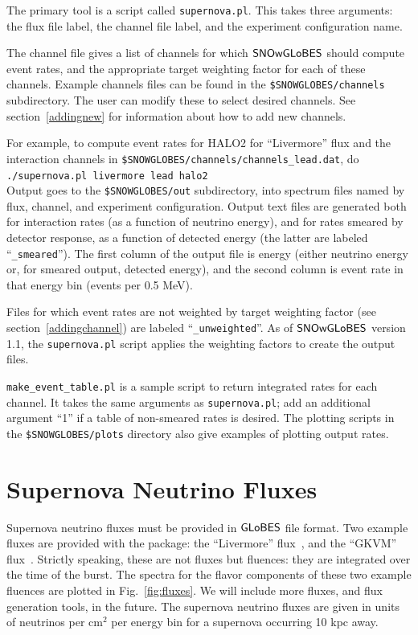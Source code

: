 \documentclass[12pt]{article}
\newcommand{\globes}{\sf{GLoBES}}
\newcommand{\snowglobes}{\sf{SNOwGLoBES}}
\begin{document}
The primary tool is a script called \texttt{supernova.pl}.  This takes three arguments: the flux file label, the channel file label, and the experiment configuration name.

The channel file gives a list of channels for which $\snowglobes$
should compute event rates, and the appropriate target weighting
factor for each of these channels.  Example channels files can be
found in the \texttt{\$SNOWGLOBES/channels} subdirectory.  The user can
modify these to select desired channels.  See section~\ref{addingnew}
for information about how to add new channels.

For example, to compute event rates for HALO2 for ``Livermore'' flux and  the interaction channels in
\texttt{\$SNOWGLOBES/channels/channels\_lead.dat}, do\\

\texttt{./supernova.pl livermore lead halo2} \\

Output goes to the \texttt{\$SNOWGLOBES/out} subdirectory, into spectrum files
named by flux, channel, and experiment configuration.  Output text
files are generated both for interaction rates (as a function of
neutrino energy), and for rates smeared by detector response, as a
function of detected energy (the latter are labeled ``\texttt{\_smeared}'').  The
first column of the output file is energy (either neutrino energy or,
for smeared output, detected energy), and the second column is event
rate in that energy bin (events per 0.5 MeV).

Files for which event rates are not weighted by target weighting factor (see section~\ref{addingchannel}) are labeled ``\texttt{\_unweighted}''.  As of
$\snowglobes$ version 1.1, the \texttt{supernova.pl} script applies the weighting factors to create the output files.

\texttt{make\_event\_table.pl} is a sample script to return integrated
rates for each channel.   It takes the same arguments as \texttt{supernova.pl}; add an additional argument ``1'' if a table of non-smeared rates is desired.
The
plotting scripts in the \texttt{\$SNOWGLOBES/plots} directory also
give examples of plotting output rates.

\section{Supernova Neutrino Fluxes}

Supernova neutrino fluxes must be provided in $\globes$ file format.  Two
example fluxes are provided with the package: the ``Livermore''
flux~\cite{Totani:1997vj}, and the ``GKVM'' flux~\cite{Gava:2009pj}.
Strictly speaking, these are not fluxes but fluences: they are
integrated over the time of the burst.  The spectra for the flavor
components of these two example fluences are plotted in
Fig.~\ref{fig:fluxes}.  We will include more fluxes, and flux generation tools, in the future.
The supernova neutrino fluxes are given in units of neutrinos per cm$^{2}$ per
energy bin for a supernova occurring 10 kpc away.
\end{document}
